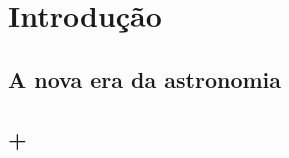 


\chapter{Introdução}
\label{sec:Intro}


\section{A nova era da astronomia}



\section{\starlight + \SDSS}
\label{sec:Intro:Starlight}




